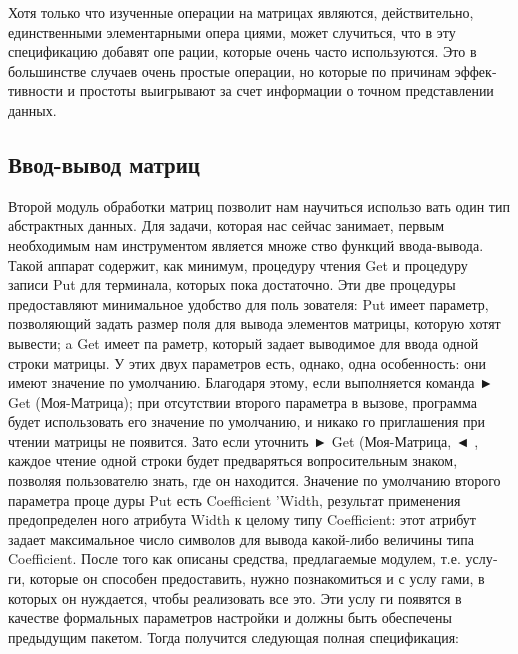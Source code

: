 \begin{mynotice}
Хотя только что изученные операции на матрицах
являются, действительно, единственными элементарными опера­
циями, может случиться, что в эту спецификацию добавят опе­
рации, которые очень часто используются. Это в большинстве
\newpage
случаев очень простые операции, но которые по причинам эффек­
тивности и простоты выигрывают за счет информации о точном
представлении данных.
\end{mynotice}

\subsection{Ввод-вывод матриц}

Второй модуль обработки матриц позволит нам научиться использо­
вать один тип абстрактных данных. Для задачи, которая нас сейчас
занимает, первым необходимым нам инструментом является множе­
ство функций ввода-вывода. Такой аппарат содержит, как минимум,
процедуру чтения Get и процедуру записи Put для терминала, которых
пока достаточно.
Эти две процедуры предоставляют минимальное удобство для поль­
зователя: Put имеет параметр, позволяющий задать размер поля для
вывода элементов матрицы, которую хотят вывести; a Get имеет па­
раметр, который задает выводимое для ввода одной строки матрицы.
У этих двух параметров есть, однако, одна особенность: они имеют
значение по умолчанию. Благодаря этому, если выполняется команда
► Get (Моя-Матрица);
при отсутствии второго параметра в вызове,
программа будет использовать его значение по умолчанию, и никако­
го приглашения при чтении матрицы не появится. Зато если уточнить
► Get (Моя-Матрица,
◄ , каждое чтение одной строки будет
предваряться вопросительным знаком, позволяя пользователю знать,
где он находится. Значение по умолчанию второго параметра проце­
дуры Put есть Coefficient ’Width, результат применения предопределен­
ного атрибута Width к целому типу Coefficient: этот атрибут задает
максимальное число символов для вывода какой-либо величины типа
Coefficient.
После того как описаны средства, предлагаемые модулем, т.е. услу­
ги, которые он способен предоставить, нужно познакомиться и с услу­
гами, в которых он нуждается, чтобы реализовать все это. Эти услу­
ги появятся в качестве формальных параметров настройки и должны
быть обеспечены предыдущим пакетом. Тогда получится следующая
полная спецификация:

